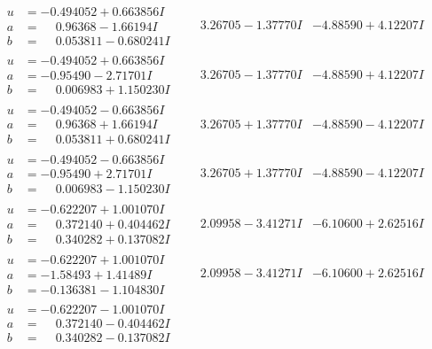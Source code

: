 \documentclass[1p]{elsarticle_modified}
\theoremstyle{definition}
\begin{document}
$$\begin{array}{c|c|c}
\begin{aligned}
u &= -0.494052 + 0.663856 I \\
a &= \phantom{-}0.96368 - 1.66194 I \\
b &= \phantom{-}0.053811 - 0.680241 I\end{aligned}
 & \phantom{-}3.26705 - 1.37770 I & -4.88590 + 4.12207 I \\ \hline\begin{aligned}
u &= -0.494052 + 0.663856 I \\
a &= -0.95490 - 2.71701 I \\
b &= \phantom{-}0.006983 + 1.150230 I\end{aligned}
 & \phantom{-}3.26705 - 1.37770 I & -4.88590 + 4.12207 I \\ \hline\begin{aligned}
u &= -0.494052 - 0.663856 I \\
a &= \phantom{-}0.96368 + 1.66194 I \\
b &= \phantom{-}0.053811 + 0.680241 I\end{aligned}
 & \phantom{-}3.26705 + 1.37770 I & -4.88590 - 4.12207 I \\ \hline\begin{aligned}
u &= -0.494052 - 0.663856 I \\
a &= -0.95490 + 2.71701 I \\
b &= \phantom{-}0.006983 - 1.150230 I\end{aligned}
 & \phantom{-}3.26705 + 1.37770 I & -4.88590 - 4.12207 I \\ \hline\begin{aligned}
u &= -0.622207 + 1.001070 I \\
a &= \phantom{-}0.372140 + 0.404462 I \\
b &= \phantom{-}0.340282 + 0.137082 I\end{aligned}
 & \phantom{-}2.09958 - 3.41271 I & -6.10600 + 2.62516 I \\ \hline\begin{aligned}
u &= -0.622207 + 1.001070 I \\
a &= -1.58493 + 1.41489 I \\
b &= -0.136381 - 1.104830 I\end{aligned}
 & \phantom{-}2.09958 - 3.41271 I & -6.10600 + 2.62516 I \\ \hline\begin{aligned}
u &= -0.622207 - 1.001070 I \\
a &= \phantom{-}0.372140 - 0.404462 I \\
b &= \phantom{-}0.340282 - 0.137082 I\end{aligned}

\end{array}$$
\end{document}
